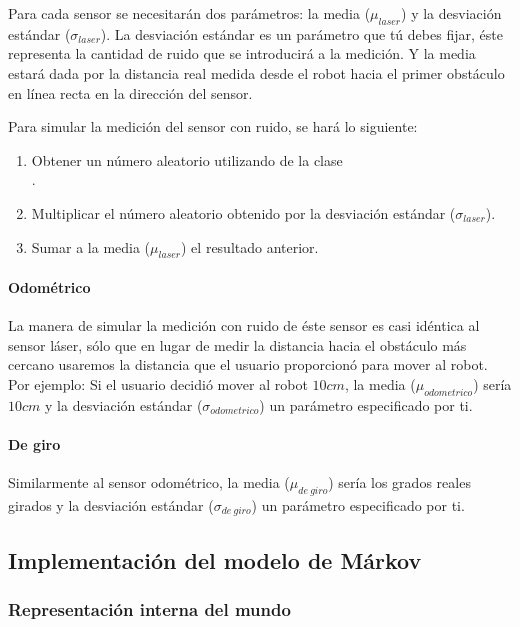 Para cada sensor se necesitarán dos parámetros: la media (\( \mu_{laser} \)) y la desviación estándar (\( \sigma_{laser} \)). La desviación estándar es un parámetro que tú debes fijar, éste representa la cantidad de ruido que se introducirá a la medición. Y la media estará dada por la distancia real medida desde el robot hacia el primer obstáculo en línea recta en la dirección del sensor.

Para simular la medición del sensor con ruido, se hará lo siguiente:

\begin{enumerate}
  \item Obtener un número aleatorio utilizando  de la clase\\ .
  \item Multiplicar el número aleatorio obtenido por la desviación estándar (\( \sigma_{laser} \)).
  \item Sumar a la media (\( \mu_{laser} \)) el resultado anterior.
\end{enumerate}


\paragraph{Odométrico}\medskip
La manera de simular la medición con ruido de éste sensor es casi idéntica al sensor láser, sólo que en lugar de medir la distancia hacia el obstáculo más cercano usaremos la distancia que el usuario proporcionó para mover al robot. Por ejemplo: Si el usuario decidió mover al robot \(10cm\), la media (\( \mu_{odometrico} \)) sería \(10cm\) y la desviación estándar (\( \sigma_{odometrico} \)) un parámetro especificado por ti.


\paragraph{De giro}\medskip
Similarmente al sensor odométrico, la media (\( \mu_{de\ giro} \)) sería los grados reales girados y la desviación estándar (\( \sigma_{de\ giro} \)) un parámetro especificado por ti.

\subsection{Implementación del modelo de Márkov}

\subsubsection{Representación interna del mundo}\medskip


